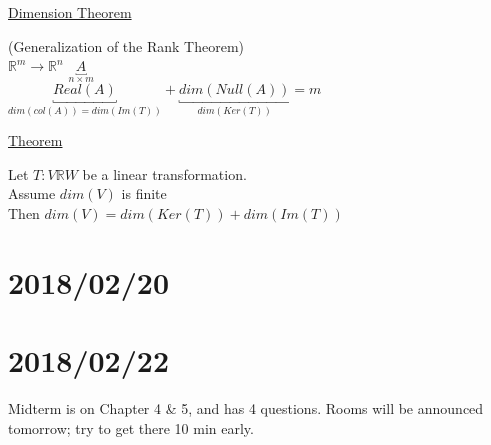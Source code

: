 \documentclass[12pt]{article}
\newcommand{\real}[0]{\mathbb{R}}
\newenvironment{block}[1][Label]{\underline{#1}\par}{}
\newenvironment{theorem}{\block[Theorem]}{\endblock}
\newcommand{\uu}[1]{\underbracket{#1}}
\newcommand{\todo}[0]{\text{\textcolor{red}{\textbackslash\textbackslash TODO \ }}}
\begin{document}
	\begin{block}[Dimension Theorem]
		(Generalization of the Rank Theorem) \\
		$\real^m \rightarrow \real^n$ \qquad $\uu{A}_{n \times m}$ \\
		$\uu{Real(A)}_{dim(col(A)) = dim(Im(T))} + \uu{dim(Null(A))}_{dim(Ker(T))} = m$
		
		\begin{theorem}
			Let $T: V \real W$ be a linear transformation. \\
			Assume $dim(V)$ is finite \\
			Then $dim(V) = dim(Ker(T)) + dim(Im(T))$
		\end{theorem}
	\end{block}
	
	\section{2018/02/20}
	
	\todo
	
	\section{2018/02/22}
	
	Midterm is on Chapter 4 \& 5, and has 4 questions. Rooms will be announced tomorrow; try to get there 10 min early.
	
\end{document}
